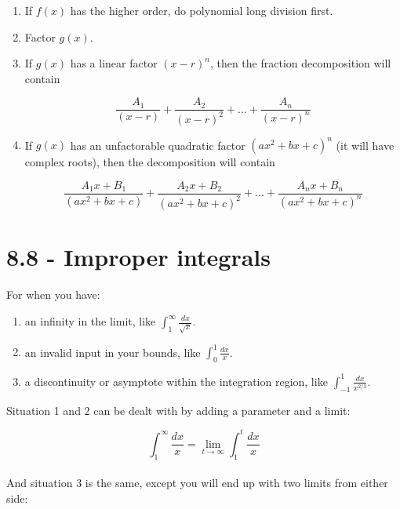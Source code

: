 \documentclass{article}
\begin{document}
\begin{multicols}{2}
\begin{enumerate}
\item
If $f(x)$ has the higher order, do polynomial long division first.

\item
Factor $g(x)$.

\item
If $g(x)$ has a linear factor $(x-r)^n$, then the fraction decomposition will contain

\begin{equation*}
\frac{A_1}{(x-r)}+
\frac{A_2}{(x-r)^2}+
...+
\frac{A_n}{(x-r)^n}
\end{equation*}

\item
If $g(x)$ has an unfactorable quadratic factor $(ax^2+bx+c)^n$ (it will have complex roots), then
the decomposition will contain

\begin{equation*}
\frac{A_1 x+B_1}{(ax^2+bx+c)}+
\frac{A_2 x+B_2}{(ax^2+bx+c)^2}+
...+
\frac{A_n x+B_n}{(ax^2+bx+c)^n}
\end{equation*}

\end{enumerate}

\section*{8.8 - Improper integrals}

For when you have:

\begin{enumerate}

\item
an infinity in the limit, like
$\int_1^{\infty} \frac{dx}{\sqrt{x}}$.

\item
an invalid input in your bounds, like
$\int_0^1 \frac{dx}{x}$.

\item
a discontinuity or asymptote within the integration region, like
$\int_{-1}^1 \frac{dx}{x^{2/3}}$.

\end{enumerate}

\noindent
Situation 1 and 2 can be dealt with by adding a parameter and a limit:

\begin{equation*}
\int_1^{\infty} \frac{dx}{x}
=\lim_{t \to \infty} \int_1^t \frac{dx}{x}
\end{equation*}
\\

\noindent
And situation 3 is the same, except you will end up with two limits from either side:


\end{multicols}
\end{document}

